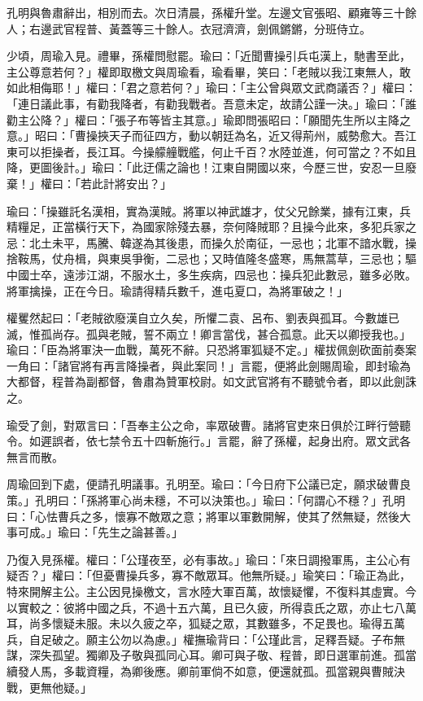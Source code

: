 孔明與魯肅辭出，相別而去。次日清晨，孫權升堂。左邊文官張昭、顧雍等三十餘人；右邊武官程普、黃蓋等三十餘人。衣冠濟濟，劍佩鏘鏘，分班侍立。

少頃，周瑜入見。禮畢，孫權問慰罷。瑜曰：「近聞曹操引兵屯漢上，馳書至此，主公尊意若何？」權即取檄文與周瑜看，瑜看畢，笑曰：「老賊以我江東無人，敢如此相侮耶！」權曰：「君之意若何？」瑜曰：「主公曾與眾文武商議否？」權曰：「連日議此事，有勸我降者，有勸我戰者。吾意未定，故請公謹一決。」瑜曰：「誰勸主公降？」權曰：「張子布等皆主其意。」瑜即問張昭曰：「願聞先生所以主降之意。」昭曰：「曹操挾天子而征四方，動以朝廷為名，近又得荊州，威勢愈大。吾江東可以拒操者，長江耳。今操艨艟戰艦，何止千百？水陸並進，何可當之？不如且降，更圖後計。」瑜曰：「此迂儒之論也！江東自開國以來，今歷三世，安忍一旦廢棄！」權曰：「若此計將安出？」

瑜曰：「操雖託名漢相，實為漢賊。將軍以神武雄才，仗父兄餘業，據有江東，兵精糧足，正當橫行天下，為國家除殘去暴，奈何降賊耶？且操今此來，多犯兵家之忌：北土未平，馬騰、韓遂為其後患，而操久於南征，一忌也；北軍不諳水戰，操捨鞍馬，仗舟楫，與東吳爭衡，二忌也；又時值隆冬盛寒，馬無蒿草，三忌也；驅中國士卒，遠涉江湖，不服水土，多生疾病，四忌也：操兵犯此數忌，雖多必敗。將軍擒操，正在今日。瑜請得精兵數千，進屯夏口，為將軍破之！」

權矍然起曰：「老賊欲廢漢自立久矣，所懼二袁、呂布、劉表與孤耳。今數雄已滅，惟孤尚存。孤與老賊，誓不兩立！卿言當伐，甚合孤意。此天以卿授我也。」瑜曰：「臣為將軍決一血戰，萬死不辭。只恐將軍狐疑不定。」權拔佩劍砍面前奏案一角曰：「諸官將有再言降操者，與此案同！」言罷，便將此劍賜周瑜，即封瑜為大都督，程普為副都督，魯肅為贊軍校尉。如文武官將有不聽號令者，即以此劍誅之。

瑜受了劍，對眾言曰：「吾奉主公之命，率眾破曹。諸將官吏來日俱於江畔行營聽令。如遲誤者，依七禁令五十四斬施行。」言罷，辭了孫權，起身出府。眾文武各無言而散。

周瑜回到下處，便請孔明議事。孔明至。瑜曰：「今日府下公議已定，願求破曹良策。」孔明曰：「孫將軍心尚未穩，不可以決策也。」瑜曰：「何謂心不穩？」孔明曰：「心怯曹兵之多，懷寡不敵眾之意；將軍以軍數開解，使其了然無疑，然後大事可成。」瑜曰：「先生之論甚善。」

乃復入見孫權。權曰：「公瑾夜至，必有事故。」瑜曰：「來日調撥軍馬，主公心有疑否？」權曰：「但憂曹操兵多，寡不敵眾耳。他無所疑。」瑜笑曰：「瑜正為此，特來開解主公。主公因見操檄文，言水陸大軍百萬，故懷疑懼，不復料其虛實。今以實較之：彼將中國之兵，不過十五六萬，且已久疲，所得袁氏之眾，亦止七八萬耳，尚多懷疑未服。未以久疲之卒，狐疑之眾，其數雖多，不足畏也。瑜得五萬兵，自足破之。願主公勿以為慮。」權撫瑜背曰：「公瑾此言，足釋吾疑。子布無謀，深失孤望。獨卿及子敬與孤同心耳。卿可與子敬、程普，即日選軍前進。孤當續發人馬，多載資糧，為卿後應。卿前軍倘不如意，便還就孤。孤當親與曹賊決戰，更無他疑。」

